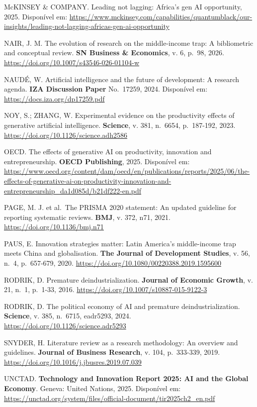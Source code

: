 \documentclass[
  brazilian,
  12pt,
]{article}
\begin{document}
McKINSEY \& COMPANY. Leading not lagging: Africa's gen AI opportunity, 2025. Disponível em: \url{https://www.mckinsey.com/capabilities/quantumblack/our-insights/leading-not-lagging-africas-gen-ai-opportunity}

NAIR, J. M. The evolution of research on the middle-income trap: A bibliometric and conceptual review. \textbf{SN Business \& Economics}, v. 6, p.~98, 2026. \url{https://doi.org/10.1007/s43546-026-01104-w}

NAUDÉ, W. Artificial intelligence and the future of development: A research agenda. \textbf{IZA Discussion Paper} No.~17259, 2024. Disponível em: \url{https://docs.iza.org/dp17259.pdf}

NOY, S.; ZHANG, W. Experimental evidence on the productivity effects of generative artificial intelligence. \textbf{Science}, v. 381, n.~6654, p.~187-192, 2023. \url{https://doi.org/10.1126/science.adh2586}

OECD. The effects of generative AI on productivity, innovation and entrepreneurship. \textbf{OECD Publishing}, 2025. Disponível em: \url{https://www.oecd.org/content/dam/oecd/en/publications/reports/2025/06/the-effects-of-generative-ai-on-productivity-innovation-and-entrepreneurship_da1d085d/b21df222-en.pdf}

PAGE, M. J. et al.~The PRISMA 2020 statement: An updated guideline for reporting systematic reviews. \textbf{BMJ}, v. 372, n71, 2021. \url{https://doi.org/10.1136/bmj.n71}

PAUS, E. Innovation strategies matter: Latin America's middle-income trap meets China and globalisation. \textbf{The Journal of Development Studies}, v. 56, n.~4, p.~657-679, 2020. \url{https://doi.org/10.1080/00220388.2019.1595600}

RODRIK, D. Premature deindustrialization. \textbf{Journal of Economic Growth}, v. 21, n.~1, p.~1-33, 2016. \url{https://doi.org/10.1007/s10887-015-9122-3}

RODRIK, D. The political economy of AI and premature deindustrialization. \textbf{Science}, v. 385, n.~6715, eadr5293, 2024. \url{https://doi.org/10.1126/science.adr5293}

SNYDER, H. Literature review as a research methodology: An overview and guidelines. \textbf{Journal of Business Research}, v. 104, p.~333-339, 2019. \url{https://doi.org/10.1016/j.jbusres.2019.07.039}

UNCTAD. \textbf{Technology and Innovation Report 2025: AI and the Global Economy}. Geneva: United Nations, 2025. Disponível em: \url{https://unctad.org/system/files/official-document/tir2025ch2_en.pdf}
\end{document}
